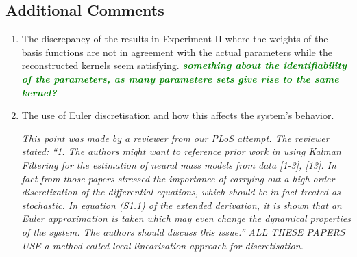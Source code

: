 \documentclass{article}
\newcommand{\mike}[1]{\textsf{\emph{\textbf{\textcolor{green}{#1}}}}}
\begin{document}
    \subsection{Additional Comments}
    
    \begin{enumerate}
        \item The discrepancy of the results in Experiment II where the weights of the basis functions are not in agreement with the actual parameters while the reconstructed kernels seem satisfying.
        \emph{\mike{something about the identifiability of the parameters, as many parametere sets give rise to the same kernel?}}

        \item The use of Euler discretisation and how this affects the system's behavior.

		\emph{This point was made by a reviewer from our PLoS attempt. The reviewer stated: ``1. The authors might want to reference prior work in using Kalman
		Filtering for the estimation of neural mass models from data [1-3],
		[13]. In fact from those papers stressed the importance of carrying out
		a high order discretization of the differential equations, which should
		be in fact treated as stochastic. In equation (S1.1) of the extended
		derivation, it is shown that an Euler approximation is taken which may
		even change the dynamical properties of the system. The authors should
		discuss this issue.'' ALL THESE PAPERS USE a method called local linearisation approach for discretisation.}\\



\end{enumerate}
\end{document}

